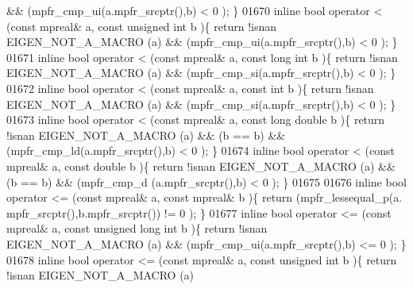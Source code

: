 \begin{DoxyCode}
       && (mpfr\_cmp\_ui(a.mpfr\_srcptr(),b) < 0 );                 \}
01670 \textcolor{keyword}{inline} \textcolor{keywordtype}{bool} operator <  (\textcolor{keyword}{const} mpreal& a, \textcolor{keyword}{const} \textcolor{keywordtype}{unsigned} \textcolor{keywordtype}{int} b      )\{  \textcolor{keywordflow}{return} !isnan EIGEN\_NOT\_A\_MACRO (a)
       && (mpfr\_cmp\_ui(a.mpfr\_srcptr(),b) < 0 );                 \}
01671 \textcolor{keyword}{inline} \textcolor{keywordtype}{bool} operator <  (\textcolor{keyword}{const} mpreal& a, \textcolor{keyword}{const} \textcolor{keywordtype}{long} \textcolor{keywordtype}{int} b          )\{  \textcolor{keywordflow}{return} !isnan EIGEN\_NOT\_A\_MACRO (a)
       && (mpfr\_cmp\_si(a.mpfr\_srcptr(),b) < 0 );                 \}
01672 \textcolor{keyword}{inline} \textcolor{keywordtype}{bool} operator <  (\textcolor{keyword}{const} mpreal& a, \textcolor{keyword}{const} \textcolor{keywordtype}{int} b               )\{  \textcolor{keywordflow}{return} !isnan EIGEN\_NOT\_A\_MACRO (a)
       && (mpfr\_cmp\_si(a.mpfr\_srcptr(),b) < 0 );                 \}
01673 \textcolor{keyword}{inline} \textcolor{keywordtype}{bool} operator <  (\textcolor{keyword}{const} mpreal& a, \textcolor{keyword}{const} \textcolor{keywordtype}{long} \textcolor{keywordtype}{double} b       )\{  \textcolor{keywordflow}{return} !isnan EIGEN\_NOT\_A\_MACRO (a)
       && (b == b) && (mpfr\_cmp\_ld(a.mpfr\_srcptr(),b) < 0 );    \}
01674 \textcolor{keyword}{inline} \textcolor{keywordtype}{bool} operator <  (\textcolor{keyword}{const} mpreal& a, \textcolor{keyword}{const} \textcolor{keywordtype}{double} b            )\{  \textcolor{keywordflow}{return} !isnan EIGEN\_NOT\_A\_MACRO (a)
       && (b == b) && (mpfr\_cmp\_d (a.mpfr\_srcptr(),b) < 0 );    \}
01675 
01676 \textcolor{keyword}{inline} \textcolor{keywordtype}{bool} operator <= (\textcolor{keyword}{const} mpreal& a, \textcolor{keyword}{const} mpreal& b           )\{  \textcolor{keywordflow}{return} (mpfr\_lessequal\_p(a.
      mpfr\_srcptr(),b.mpfr\_srcptr()) != 0 );          \}
01677 \textcolor{keyword}{inline} \textcolor{keywordtype}{bool} operator <= (\textcolor{keyword}{const} mpreal& a, \textcolor{keyword}{const} \textcolor{keywordtype}{unsigned} \textcolor{keywordtype}{long} \textcolor{keywordtype}{int} b )\{  \textcolor{keywordflow}{return} !isnan EIGEN\_NOT\_A\_MACRO (a)
       && (mpfr\_cmp\_ui(a.mpfr\_srcptr(),b) <= 0 );                \}
01678 \textcolor{keyword}{inline} \textcolor{keywordtype}{bool} operator <= (\textcolor{keyword}{const} mpreal& a, \textcolor{keyword}{const} \textcolor{keywordtype}{unsigned} \textcolor{keywordtype}{int} b      )\{  \textcolor{keywordflow}{return} !isnan EIGEN\_NOT\_A\_MACRO (a)

\end{DoxyCode}
